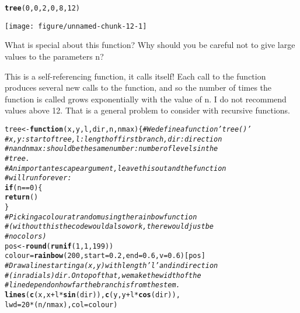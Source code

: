 \documentclass[12pt,a4paper]{scrartcl}\usepackage[]{graphicx}\usepackage[]{color}
\makeatletter
\def\maxwidth{ %
  \ifdim\Gin@nat@width>\linewidth
    \linewidth
  \else
    \Gin@nat@width
  \fi
}
\newcommand{\hlnum}[1]{\textcolor[rgb]{0.686,0.059,0.569}{#1}}%
\newcommand{\hlcom}[1]{\textcolor[rgb]{0.678,0.584,0.686}{\textit{#1}}}%
\newcommand{\hlopt}[1]{\textcolor[rgb]{0,0,0}{#1}}%
\newcommand{\hlstd}[1]{\textcolor[rgb]{0.345,0.345,0.345}{#1}}%
\newcommand{\hlkwa}[1]{\textcolor[rgb]{0.161,0.373,0.58}{\textbf{#1}}}%
\newcommand{\hlkwb}[1]{\textcolor[rgb]{0.69,0.353,0.396}{#1}}%
\newcommand{\hlkwc}[1]{\textcolor[rgb]{0.333,0.667,0.333}{#1}}%
\newcommand{\hlkwd}[1]{\textcolor[rgb]{0.737,0.353,0.396}{\textbf{#1}}}%
\newenvironment{kframe}{%
 \def\at@end@of@kframe{}%
 \ifinner\ifhmode%
  \def\at@end@of@kframe{\end{minipage}}%
  \begin{minipage}{\columnwidth}%
 \fi\fi%
 \def\FrameCommand##1{\hskip\@totalleftmargin \hskip-\fboxsep
 \colorbox{shadecolor}{##1}\hskip-\fboxsep
     \hskip-\linewidth \hskip-\@totalleftmargin \hskip\columnwidth}%
 \MakeFramed {\advance\hsize-\width
   \@totalleftmargin\z@ \linewidth\hsize
   \@setminipage}}%
 {\par\unskip\endMakeFramed%
 \at@end@of@kframe}
\newenvironment{knitrout}{}{} %
\makeatother
\begin{document}
\begin{Exercise}[difficulty=2, title={What does this function do?}]
\begin{knitrout}
\begin{kframe}
\begin{alltt}
\hlkwd{tree}\hlstd{(}\hlnum{0}\hlstd{,}\hlnum{0}\hlstd{,}\hlnum{2}\hlstd{,}\hlnum{0}\hlstd{,}\hlnum{8}\hlstd{,}\hlnum{12}\hlstd{)}
\end{alltt}
\end{kframe}
\texttt{[image: figure/unnamed-chunk-12-1]} 

\end{knitrout}

What is special about this function? Why should you be careful not to give large values to the parameters n? 
\end{Exercise}
\begin{Answer}
This is a self-referencing function, it calls itself! Each call to the function produces several new calls to the function, and so the number of times the function is called grows exponentially with the value of n. I do not recommend values above 12. That is a general problem to consider with recursive functions. 
\begin{knitrout}
\color{fgcolor}\begin{kframe}
\begin{alltt}
\hlstd{tree}\hlkwb{<-}\hlkwa{function}\hlstd{(}\hlkwc{x}\hlstd{,}\hlkwc{y}\hlstd{,}\hlkwc{l}\hlstd{,}\hlkwc{dir}\hlstd{,}\hlkwc{n}\hlstd{,}\hlkwc{nmax}\hlstd{)\{} \hlcom{# We define a function 'tree()'}
\hlcom{# x,y: start of tree, l: length of first branch, dir: direction}
\hlcom{# n and nmax: should be the same number: number of levels in the}
\hlcom{# tree.}
\hlcom{# An important escape argument, leave this out and the function}
\hlcom{# will run forever:}
\hlkwa{if}\hlstd{(n}\hlopt{==}\hlnum{0}\hlstd{)\{}
\hlkwd{return}\hlstd{()}
\hlstd{\}}
\hlcom{# Picking a colour at random using the rainbow function}
\hlcom{# (without this the code would also work, there would just be}
\hlcom{# no colors)}
\hlstd{pos}\hlkwb{<-}\hlkwd{round}\hlstd{(}\hlkwd{runif}\hlstd{(}\hlnum{1}\hlstd{,}\hlnum{1}\hlstd{,}\hlnum{199}\hlstd{))}
\hlstd{colour}\hlkwb{=}\hlkwd{rainbow}\hlstd{(}\hlnum{200}\hlstd{,}\hlkwc{start}\hlstd{=}\hlnum{0.2}\hlstd{,}\hlkwc{end}\hlstd{=}\hlnum{0.6}\hlstd{,}\hlkwc{v}\hlstd{=}\hlnum{0.6}\hlstd{)[pos]}
\hlcom{# Draw a line starting a (x,y) with length 'l' and in direction}
\hlcom{# (in radials) dir. On top of that, we make the width of the}
\hlcom{# line depend on how far the branch is from the stem.}
\hlkwd{lines}\hlstd{(}\hlkwd{c}\hlstd{(x,x}\hlopt{+}\hlstd{l}\hlopt{*}\hlkwd{sin}\hlstd{(dir)),}\hlkwd{c}\hlstd{(y,y}\hlopt{+}\hlstd{l}\hlopt{*}\hlkwd{cos}\hlstd{(dir)),}
      \hlkwc{lwd}\hlstd{=}\hlnum{20}\hlopt{*}\hlstd{(n}\hlopt{/}\hlstd{nmax),}\hlkwc{col}\hlstd{=colour)}

\end{alltt}
\end{kframe}
\end{knitrout}
\end{Answer}
\end{document}
